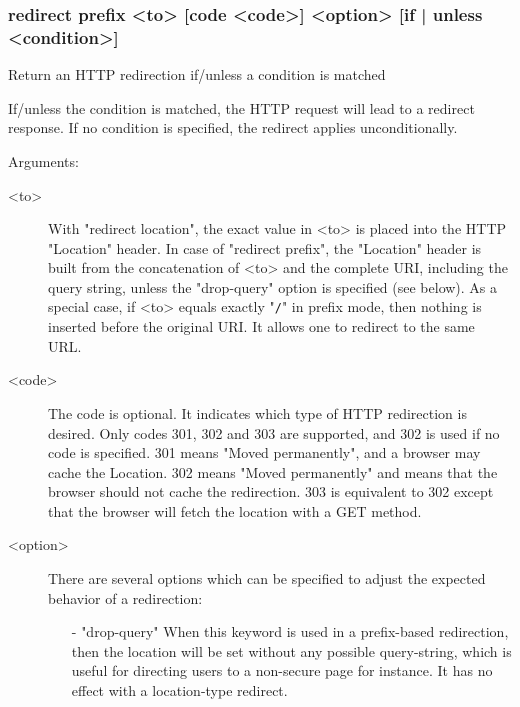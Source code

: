 \subsubsection[redirect prefix] {redirect prefix   <to> [code <code>] <option> [{if | unless} <condition>]}


  Return an HTTP redirection if/unless a condition is matched


  If/unless the condition is matched, the HTTP request will lead to a redirect
  response. If no condition is specified, the redirect applies unconditionally.

  Arguments:
  \begin{description}
  \item[<to>] With "redirect location", the exact value in <to> is placed into
              the HTTP "Location" header. In case of "redirect prefix", the
              "Location" header is built from the concatenation of <to> and the
              complete URI, including the query string, unless the "drop-query"
              option is specified (see below). As a special case, if <to>
              equals exactly "\verb|/|" in prefix mode, then nothing is inserted
              before the original URI. It allows one to redirect to the same
              URL.

  \item[<code>] The code is optional. It indicates which type of HTTP redirection
              is desired. Only codes 301, 302 and 303 are supported, and 302 is
              used if no code is specified. 301 means "Moved permanently", and
              a browser may cache the Location. 302 means "Moved permanently"
              and means that the browser should not cache the redirection. 303
              is equivalent to 302 except that the browser will fetch the
              location with a GET method.

  \item[<option>] There are several options which can be specified to adjust the
              expected behavior of a redirection:
      \begin{itemize}
      \item[-] "drop-query"
        When this keyword is used in a prefix-based redirection, then the
        location will be set without any possible query-string, which is useful
        for directing users to a non-secure page for instance. It has no effect
        with a location-type redirect.


\end{itemize}
\end{description}
